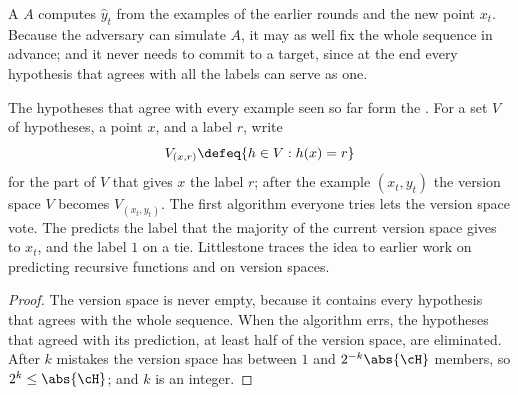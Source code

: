\begin{refsection}
A  $A$ computes $\hat y_t$ from the examples of the earlier rounds and the new point $x_t$. Because the adversary can simulate $A$, it may as well fix the whole sequence in advance; and it never needs to commit to a target, since at the end every hypothesis that agrees with all the labels can serve as one.


The hypotheses that agree with every example seen so far form the . For a set $V$ of hypotheses, a point $x$, and a label $r$, write
\[
  V_{(x,r)} \defeq \{h\in V : h(x)=r\}
\]
for the part of $V$ that gives $x$ the label $r$; after the example $(x_t,y_t)$ the version space $V$ becomes $V_{(x_t,y_t)}$. The first algorithm everyone tries lets the version space vote. The  predicts the label that the majority of the current version space gives to $x_t$, and the label $1$ on a tie. Littlestone traces the idea to earlier work on predicting recursive functions and on version spaces.


\begin{proof}
The version space is never empty, because it contains every hypothesis that agrees with the whole sequence. When the algorithm errs, the hypotheses that agreed with its prediction, at least half of the version space, are eliminated. After $k$ mistakes the version space has between $1$ and $2^{-k}\abs{\cH}$ members, so $2^k\le\abs{\cH}$; and $k$ is an integer.
\end{proof}


\end{refsection}

